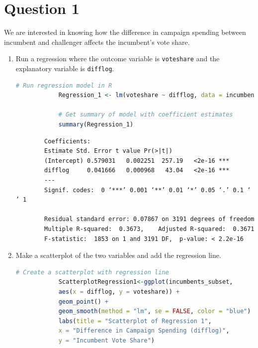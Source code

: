 \documentclass[12pt,letterpaper]{article}
\begin{document}
\section*{Question 1}
\vspace{.25cm}
\noindent We are interested in knowing how the difference in campaign spending between incumbent and challenger affects the incumbent's vote share. 
	\begin{enumerate}
		\item Run a regression where the outcome variable is \texttt{voteshare} and the explanatory variable is \texttt{difflog}.	\vspace{1cm}
		
		\begin{lstlisting}[language=R, caption={Regression Model 1 in R}, label={lst:regression_model}]
			# Run regression model in R
			Regression_1 <- lm(voteshare ~ difflog, data = incumbents_subset)
			
			# Get summary of model with coefficient estimates
			summary(Regression_1)
		\end{lstlisting}		
			
		\begin{verbatim}
		Coefficients:
		Estimate Std. Error t value Pr(>|t|)    
		(Intercept) 0.579031   0.002251  257.19   <2e-16 ***
		difflog     0.041666   0.000968   43.04   <2e-16 ***
		---
		Signif. codes:  0 ‘***’ 0.001 ‘**’ 0.01 ‘*’ 0.05 ‘.’ 0.1 ‘ ’ 1
		
		Residual standard error: 0.07867 on 3191 degrees of freedom
		Multiple R-squared:  0.3673,	Adjusted R-squared:  0.3671 
		F-statistic:  1853 on 1 and 3191 DF,  p-value: < 2.2e-16
			\end{verbatim}
			
		\item Make a scatterplot of the two variables and add the regression line. 	\vspace{7cm}
		
		\vspace{-7cm}
		
		\begin{lstlisting}[language=R, caption={Scatterplot 1 code in R}, label={lst:regression_model}]
			# Create a scatterplot with regression line
			ScatterplotRegression1<-ggplot(incumbents_subset, 
			aes(x = difflog, y = voteshare)) +
			geom_point() +
			geom_smooth(method = "lm", se = FALSE, color = "blue") +
			labs(title = "Scatterplot of Regression 1",
			x = "Difference in Campaign Spending (difflog)",
			y = "Incumbent Vote Share")
			

\end{lstlisting}
\end{enumerate}
\end{document}
